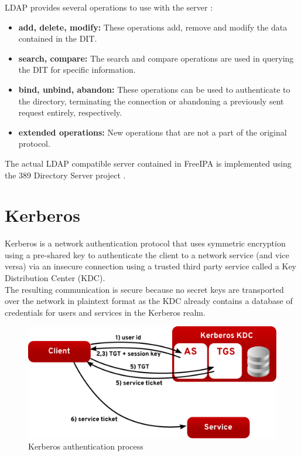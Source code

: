 LDAP provides several operations to use with the server \cite{ldapRFC}:

\begin{itemize}
    \item \textbf{add, delete, modify:} These operations add, remove and modify the data contained in the DIT.
    \item \textbf{search, compare:} The search and compare operations are used in querying the DIT for specific information.
    \item \textbf{bind, unbind, abandon:} These operations can be used to authenticate to the directory, terminating the connection or abandoning a previously sent request entirely, respectively.
    \item \textbf{extended operations:} New operations that are not a part of the original protocol.
\end{itemize}

The actual LDAP compatible server contained in FreeIPA is implemented using the 389 Directory Server project \cite{ldapWeb}.

\section{Kerberos}
Kerberos \cite{kerbRFC} is a network authentication protocol that uses symmetric encryption using a pre-shared key to authenticate the client to a network service (and vice versa) via an insecure connection using a trusted third party service called a Key Distribution Center (KDC). \\
The resulting communication is secure because no secret keys are transported over the network in plaintext format as the KDC already contains a database of credentials for users and services in the Kerberos realm. \\

\begin{figure}[!ht]
    \centering
        \includegraphics[scale=0.6]{fig/kerb}
    \caption{Kerberos authentication process}
    \label{fig:kerb}
\end{figure}


